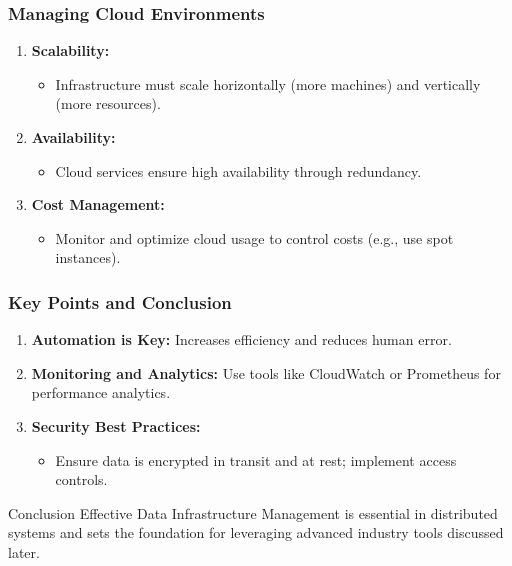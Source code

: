 \documentclass[aspectratio=169]{beamer}
\begin{document}
\begin{frame}[fragile]
  \frametitle{Managing Cloud Environments}
  \begin{enumerate}
    \item \textbf{Scalability:} 
    \begin{itemize}
      \item Infrastructure must scale horizontally (more machines) and vertically (more resources).
    \end{itemize}
    
    \item \textbf{Availability:} 
    \begin{itemize}
      \item Cloud services ensure high availability through redundancy.
    \end{itemize}
    
    \item \textbf{Cost Management:} 
    \begin{itemize}
      \item Monitor and optimize cloud usage to control costs (e.g., use spot instances).
    \end{itemize}
  \end{enumerate}
\end{frame}

\begin{frame}[fragile]
  \frametitle{Key Points and Conclusion}
  \begin{enumerate}
    \item \textbf{Automation is Key:} Increases efficiency and reduces human error.
    \item \textbf{Monitoring and Analytics:} Use tools like CloudWatch or Prometheus for performance analytics.
    \item \textbf{Security Best Practices:} 
    \begin{itemize}
      \item Ensure data is encrypted in transit and at rest; implement access controls.
    \end{itemize}
  \end{enumerate}
  
  \begin{block}{Conclusion}
    Effective Data Infrastructure Management is essential in distributed systems and sets the foundation for leveraging advanced industry tools discussed later.
  \end{block}
\end{frame}
\end{document}
